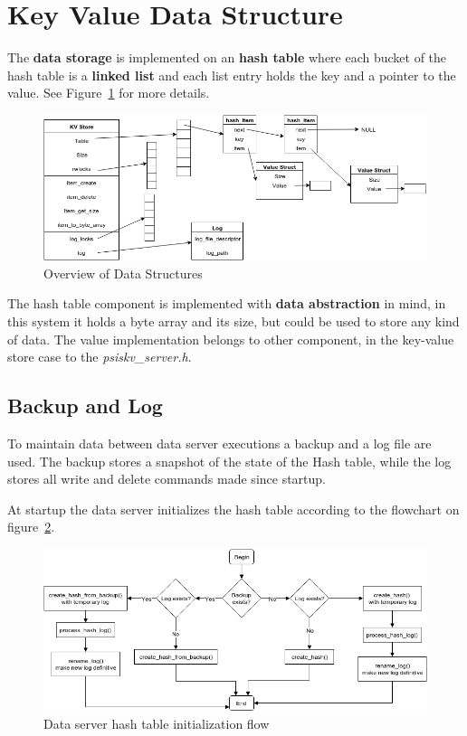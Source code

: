\documentclass[12pt]{article} %
\begin{document}
\section{Key Value Data Structure}

The \textbf{data storage} is implemented on an \textbf{hash table} where each bucket of the hash table is a \textbf{linked list} and each list entry holds the key and a pointer to the value. See Figure~\ref{fig:DataOverview} for more details.

\begin{figure}[H]
\centering
\includegraphics[width=\textwidth]{./Pictures/DataStructures.png}
\caption{Overview of Data Structures}\label{fig:DataOverview}
\end{figure}

The hash table component is implemented with \textbf{data abstraction} in mind, in this system it holds a byte array and its size, but could be used to store any kind of data. The value implementation belongs to other component, in the key-value store case to the \emph{psiskv\_server.h}.

\subsection{Backup and Log}
\label{sub:BackupLog}

To maintain data between data server executions a backup and a log file are used. The backup stores a snapshot of the state of the Hash table, while the log stores all write and delete commands made since startup.

At startup the data server initializes the hash table according to the flowchart on figure~\ref{fig:BackupLogFlow}.

\begin{figure}[H]
\centering
\includegraphics[width=\textwidth]{./Pictures/BackupLogFlow.png}
\caption{Data server hash table initialization flow}\label{fig:BackupLogFlow}
\end{figure}
\end{document}
